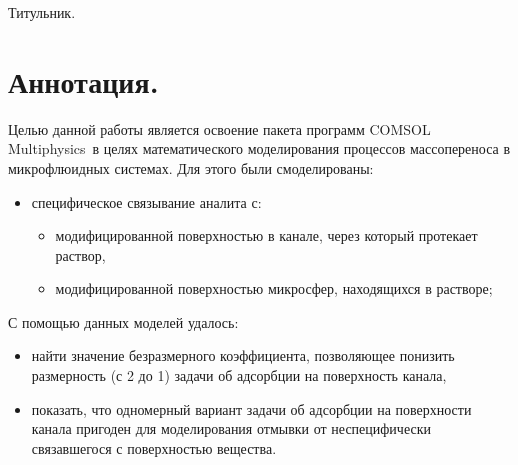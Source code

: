 \documentclass[oneside,final,12pt]{extreport}
\begin{document}
\begin{titlepage}

Титульник.

\end{titlepage}
\setcounter{page}{2}

\section*{Аннотация.}
Целью данной работы является освоение пакета программ
COMSOL Multiphysics\texttrademark\ в целях
математического моделирования процессов массопереноса в микрофлюидных системах.
Для этого были смоделированы:
\begin{itemize}
  \item специфическое связывание аналита с:
    \begin{itemize}
      \item модифицированной поверхностью в канале, через который протекает раствор,
      \item модифицированной поверхностью микросфер, находящихся в растворе;

    \end{itemize}


\end{itemize}

С помощью данных моделей удалось:
\begin{itemize}
  \item найти значение безразмерного коэффициента,
    позволяющее понизить размерность (с 2 до 1) задачи об адсорбции на
    поверхность канала,
  \item показать, что одномерный вариант задачи об адсорбции на поверхности канала
    пригоден для моделирования отмывки от неспецифически связавшегося с поверхностью вещества.

\end{itemize}



\tableofcontents
\end{document}
